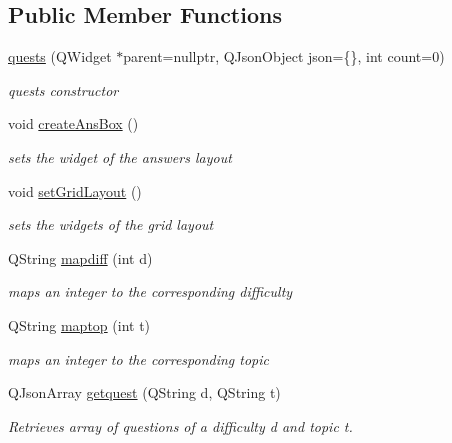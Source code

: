 \subsection*{Public Member Functions}
\begin{DoxyCompactItemize}
\item 
\hyperlink{classquests_a54541119f891382cdda66b247edc090b}{quests} (Q\+Widget $\ast$parent=nullptr, Q\+Json\+Object json=\{\}, int count=0)
\begin{DoxyCompactList}\small\item\em quests constructor \end{DoxyCompactList}\item 
\mbox{\label{classquests_a3b538c389f15ef6f79fdcdf114b27392}} 
void \hyperlink{classquests_a3b538c389f15ef6f79fdcdf114b27392}{create\+Ans\+Box} ()
\begin{DoxyCompactList}\small\item\em sets the widget of the answers layout \end{DoxyCompactList}\item 
\mbox{\label{classquests_aca51e37f6ef603d3caaff95661eed638}} 
void \hyperlink{classquests_aca51e37f6ef603d3caaff95661eed638}{set\+Grid\+Layout} ()
\begin{DoxyCompactList}\small\item\em sets the widgets of the grid layout \end{DoxyCompactList}\item 
Q\+String \hyperlink{classquests_a99d693e004d57fbea81a6ef92d843e32}{mapdiff} (int d)
\begin{DoxyCompactList}\small\item\em maps an integer to the corresponding difficulty \end{DoxyCompactList}\item 
Q\+String \hyperlink{classquests_a360c52960fcebef73ffd987d5fe0cefc}{maptop} (int t)
\begin{DoxyCompactList}\small\item\em maps an integer to the corresponding topic \end{DoxyCompactList}\item 
Q\+Json\+Array \hyperlink{classquests_a1c75a4a0a1e429e5ed5b0a7c08a842cf}{getquest} (Q\+String d, Q\+String t)
\begin{DoxyCompactList}\small\item\em Retrieves array of questions of a difficulty d and topic t. \end{DoxyCompactList}\item 

\end{DoxyCompactItemize}
